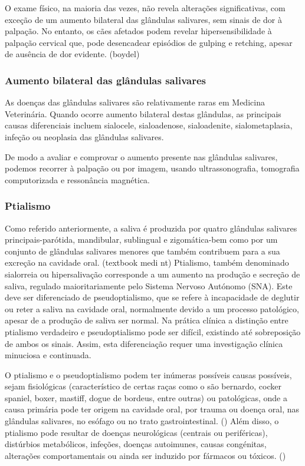 O exame físico, na maioria das vezes, não revela alterações significativas, com exceção de um aumento bilateral das glândulas salivares, sem sinais de dor à palpação. No entanto, os cães afetados podem revelar hipersensibilidade à palpação cervical que, pode desencadear episódios de gulping e retching, apesar de ausência de dor evidente. (boydel)

\subsubsection{Aumento bilateral das glândulas salivares} 

As doenças das glândulas salivares são relativamente raras em Medicina Veterinária. Quando ocorre aumento bilateral destas glândulas, as principais causas diferenciais incluem sialocele, sialoadenose, sialoadenite, sialometaplasia, infeção ou neoplasia das glândulas salivares.


De modo a avaliar e comprovar o aumento presente nas glândulas salivares, podemos recorrer à palpação ou por imagem, usando ultrassonografia, tomografia computorizada e ressonância magnética.

\subsubsection{Ptialismo} 

Como referido anteriormente, a saliva é produzida por quatro glândulas salivares principais-parótida, mandibular, sublingual e zigomática-bem como por um conjunto de glândulas salivares menores que também contribuem para a sua excreção na cavidade oral. (textbook medi nt)
Ptialismo, também denominado sialorreia ou hipersalivação corresponde a um aumento na produção e secreção de saliva, regulado maioritariamente pelo Sistema Nervoso Autónomo (SNA). Este deve ser diferenciado de pseudoptialismo, que se refere à incapacidade de deglutir ou reter a saliva na cavidade oral, normalmente devido a um processo patológico, apesar de a produção de saliva ser normal.
 Na prática clínica a distinção entre ptialismo verdadeiro e pseudoptialismo pode ser difícil, existindo até sobreposição de ambos os sinais. Assim, esta diferenciação requer uma investigação clínica minuciosa e continuada. \cite{bsava_2020_gastro}


O ptialismo e o pseudoptialismo podem ter inúmeras possíveis causas possíveis, sejam fisiológicas (característico de certas raças como o são bernardo, cocker spaniel, boxer, mastiff, dogue de bordeus, entre outras) \cite{canine_gastro_2013} ou patológicas, onde a causa primária pode ter origem na cavidade oral, por trauma ou doença oral, \cite{canine_gastro_2013}nas glândulas salivares, no esófago ou no trato gastrointestinal. (\cite{Kook2013}) Além disso, o ptialismo pode resultar de doenças neurológicas (centrais ou periféricas), distúrbios metabólicos, infeções, doenças autoimunes, causas congénitas, alterações comportamentais ou ainda ser induzido por fármacos ou tóxicos. (\cite{Kook2013}) 


